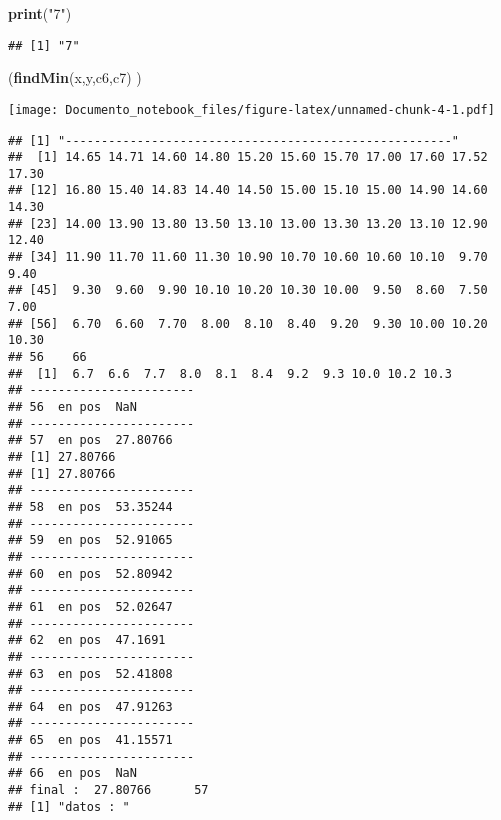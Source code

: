 \documentclass[]{article}
\newenvironment{Shaded}{\begin{snugshade}}{\end{snugshade}}
\newcommand{\KeywordTok}[1]{\textcolor[rgb]{0.13,0.29,0.53}{\textbf{#1}}}
\newcommand{\StringTok}[1]{\textcolor[rgb]{0.31,0.60,0.02}{#1}}
\newcommand{\NormalTok}[1]{#1}
\begin{document}
\begin{Shaded}
\begin{Highlighting}[]
\KeywordTok{print}\NormalTok{(}\StringTok{"7"}\NormalTok{)}
\end{Highlighting}
\end{Shaded}

\begin{verbatim}
## [1] "7"
\end{verbatim}

\begin{Shaded}
\begin{Highlighting}[]
\NormalTok{(}\KeywordTok{findMin}\NormalTok{(x,y,c6,c7) )}
\end{Highlighting}
\end{Shaded}

\texttt{[image: Documento\_notebook\_files/figure-latex/unnamed-chunk-4-1.pdf]}

\begin{verbatim}
## [1] "------------------------------------------------------"
##  [1] 14.65 14.71 14.60 14.80 15.20 15.60 15.70 17.00 17.60 17.52 17.30
## [12] 16.80 15.40 14.83 14.40 14.50 15.00 15.10 15.00 14.90 14.60 14.30
## [23] 14.00 13.90 13.80 13.50 13.10 13.00 13.30 13.20 13.10 12.90 12.40
## [34] 11.90 11.70 11.60 11.30 10.90 10.70 10.60 10.60 10.10  9.70  9.40
## [45]  9.30  9.60  9.90 10.10 10.20 10.30 10.00  9.50  8.60  7.50  7.00
## [56]  6.70  6.60  7.70  8.00  8.10  8.40  9.20  9.30 10.00 10.20 10.30
## 56    66 
##  [1]  6.7  6.6  7.7  8.0  8.1  8.4  9.2  9.3 10.0 10.2 10.3
## -----------------------
## 56  en pos  NaN 
## -----------------------
## 57  en pos  27.80766 
## [1] 27.80766
## [1] 27.80766
## -----------------------
## 58  en pos  53.35244 
## -----------------------
## 59  en pos  52.91065 
## -----------------------
## 60  en pos  52.80942 
## -----------------------
## 61  en pos  52.02647 
## -----------------------
## 62  en pos  47.1691 
## -----------------------
## 63  en pos  52.41808 
## -----------------------
## 64  en pos  47.91263 
## -----------------------
## 65  en pos  41.15571 
## -----------------------
## 66  en pos  NaN 
## final :  27.80766      57 
## [1] "datos : "
\end{verbatim}
\end{document}
